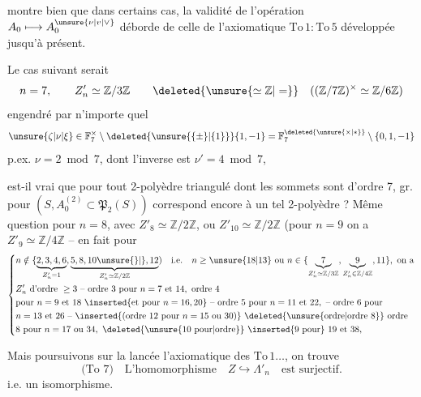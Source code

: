 
montre bien que dans certains cas, la validité de l'opération $A_0\longmapsto A_0^{\unsure{\nu|v|\vee}}$ déborde de celle de l'axiomatique $\mathrm{To}\,1:\mathrm{To}\,5$ développée jusqu'à présent.

Le cas suivant serait
\[
 n=7,\qquad Z'_n\simeq\mathbb Z/3\mathbb Z
 \qquad \deleted{\unsure{\simeq\mathbb Z|=}}\quad
 ((\mathbb Z/7\mathbb Z)^\times\simeq\mathbb Z/6\mathbb Z)
\]
engendré par n'importe quel
\[
 \unsure{\zeta|\nu|\xi}\in\mathbb F_7^\times\setminus\deleted{\unsure{\{\pm\}|\{1\}}}\{1,-1\}
 =\mathbb F_7^{\deleted{\unsure{\times|*}}}\setminus\{0,1,-1\}
\]
p.ex. $\nu=2\bmod 7$, dont l'inverse est $\nu'=4\bmod 7$,

est-il vrai que pour tout 2-polyèdre  triangulé  dont les sommets sont  d'ordre 7,   gr. pour $(S,A_0^{(2)}\subset\mathfrak P_2(S))$ correspond encore à un tel 2-polyèdre ? Même question pour $n=8$, avec $Z'_8\simeq\mathbb Z/2\mathbb Z$, ou  $Z'_{10}\simeq\mathbb Z/2\mathbb Z$ (pour $n=9$ on a $Z'_9\simeq\mathbb Z/4\mathbb Z$ -- en fait pour
\[
\left\{\begin{aligned}
&n\notin\{\underbrace{2,3,4,6}_{Z'_n=1},
 \underbrace{5,8,10\unsure{\}|{}},12}_{Z'_n\simeq\mathbb Z/2\mathbb Z})
 \quad\text{i.e.}\quad n\geq\unsure{18|13}\ \text{ou}\ n\in\{
 \underbrace{7}_{Z'_n\simeq\mathbb Z/3\mathbb Z},
 \underbrace{9}_{Z'_n\in\mathbb Z/4\mathbb Z},11\},\ \text{on a}\\
&Z'_n\ \text{d'ordre}\ \geq3\ \text{-- ordre 3 pour}\ n=7\ \text{et }14,\ \text{ordre }4\\
&\text{pour }n=9\ \text{et }18\ \inserted{\text{et pour }n=16,20}\ \text{-- ordre 5 pour }n=11\ \text{et }22,\ \text{-- ordre 6 pour}\\
&n=13\ \text{et }26\ \text{-- }\inserted{\text{(ordre 12 pour }n=15\ \text{ou }30\text{)}}\
  \deleted{\text{\unsure{ordre|ordre 8}}}\ \text{ordre}\\
&8\ \text{pour }n=17\ \text{ou }34,\ \deleted{\text{\unsure{10 pour|ordre}}}\
 \inserted{\text{9 pour}}\ 19\ \text{et }38,
\end{aligned}\right.
\]

Mais poursuivons sur la lancée  l'axiomatique des $\mathrm{To}\,1\ldots$, on trouve
\[
 \text{(To 7)}\quad \text{L'homomorphisme}\quad Z\hookrightarrow\Lambda'_n\quad\text{est surjectif.}\tag*{(38)}
\]
i.e. un isomorphisme.

